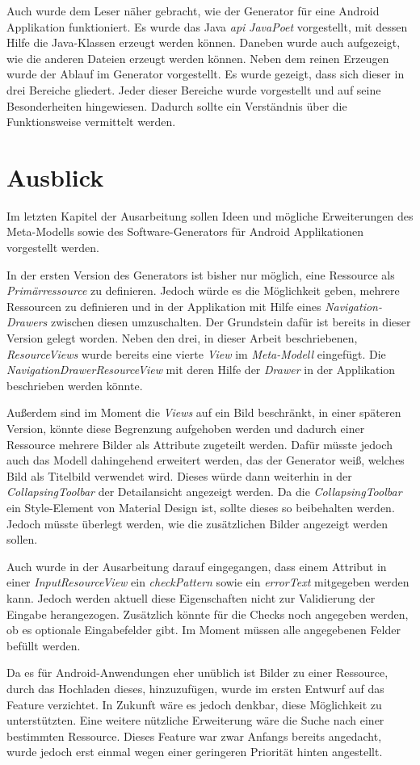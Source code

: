 Auch wurde dem Leser näher gebracht, wie der Generator für eine Android Applikation funktioniert. Es wurde das Java \textit{\acf{api}} \textit{JavaPoet} vorgestellt, mit dessen Hilfe die Java-Klassen erzeugt werden können. Daneben wurde auch aufgezeigt, wie die anderen Dateien erzeugt werden können. 
Neben dem reinen Erzeugen wurde der Ablauf im Generator vorgestellt. Es wurde gezeigt, dass sich dieser in drei Bereiche gliedert.
Jeder dieser Bereiche wurde vorgestellt und auf seine Besonderheiten hingewiesen. Dadurch sollte ein Verständnis über die Funktionsweise vermittelt werden.  

\section{Ausblick}

Im letzten Kapitel der Ausarbeitung sollen Ideen und mögliche Erweiterungen des Meta-Modells sowie des Software-Generators für Android Applikationen vorgestellt werden.

In der ersten Version des Generators ist bisher nur möglich, eine Ressource als \textit{Primärressource} zu definieren. Jedoch würde es die Möglichkeit geben, mehrere Ressourcen zu definieren und in der Applikation mit Hilfe eines \textit{Navigation-Drawers} zwischen diesen umzuschalten. Der Grundstein dafür ist bereits in dieser Version gelegt worden. Neben den drei, in dieser Arbeit beschriebenen, \textit{ResourceViews} wurde bereits eine vierte \textit{View} im \textit{Meta-Modell} eingefügt. Die \textit{NavigationDrawerResourceView} mit deren Hilfe der \textit{Drawer} in der Applikation beschrieben werden könnte.

Außerdem sind im Moment die \textit{Views} auf ein Bild beschränkt, in einer späteren Version,  könnte diese Begrenzung  aufgehoben werden und dadurch einer Ressource mehrere Bilder als Attribute zugeteilt werden. Dafür müsste jedoch auch das Modell dahingehend erweitert werden, das der Generator weiß, welches Bild als Titelbild verwendet wird. Dieses würde dann weiterhin in der \textit{CollapsingToolbar} der Detailansicht angezeigt werden. Da die \textit{CollapsingToolbar} ein Style-Element von Material Design ist, sollte dieses so beibehalten werden. Jedoch müsste überlegt werden, wie die zusätzlichen Bilder angezeigt werden sollen.

\newpage

Auch wurde in der Ausarbeitung darauf eingegangen, dass einem Attribut in einer \textit{InputResourceView} ein \textit{checkPattern} sowie ein \textit{errorText} mitgegeben werden kann. Jedoch werden aktuell diese Eigenschaften nicht zur Validierung der Eingabe herangezogen. Zusätzlich könnte für die Checks noch angegeben werden, ob es optionale Eingabefelder gibt. Im Moment müssen alle angegebenen Felder befüllt werden.

Da es für Android-Anwendungen eher unüblich ist Bilder zu einer Ressource, durch das Hochladen dieses, hinzuzufügen, wurde im ersten Entwurf auf das Feature verzichtet. In Zukunft wäre es jedoch denkbar, diese Möglichkeit zu unterstützten. 
Eine weitere nützliche Erweiterung wäre die Suche nach einer bestimmten Ressource. Dieses Feature war zwar Anfangs bereits angedacht, wurde jedoch erst einmal wegen einer geringeren Priorität hinten angestellt.